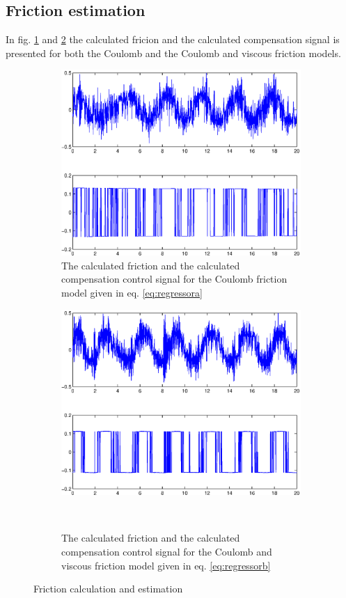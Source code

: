 \documentclass[10pt,a4paper]{article}
\begin{document}
\subsection{Friction estimation}
In fig. \ref{subfigure:VLUFcol} and \ref{subfigure:VLUFvisc} the calculated fricion and the calculated compensation signal is presented for both the Coulomb and the Coulomb and viscous friction models.
\begin{figure}[H]
\centering
	\begin{subfigure}[t]{0.49\textwidth}
	\includegraphics[width=1\textwidth]{plots/vlufcolbest.eps}
	\caption{The calculated friction and the calculated compensation control signal for the Coulomb friction model given in eq. \ref{eq:regressora}}
	\label{subfigure:VLUFcol}
	\end{subfigure}
	\begin{subfigure}[t]{0.49\textwidth}
	\includegraphics[width=1\textwidth]{plots/vlufviscbest.eps}
	\caption{The calculated friction and the calculated compensation control signal for the Coulomb and viscous friction model given in eq. \ref{eq:regressorb}}\
	\label{subfigure:VLUFvisc}
	\end{subfigure}
\caption{Friction calculation and estimation}
\label{fig:VLUF}
\end{figure}
\end{document}
